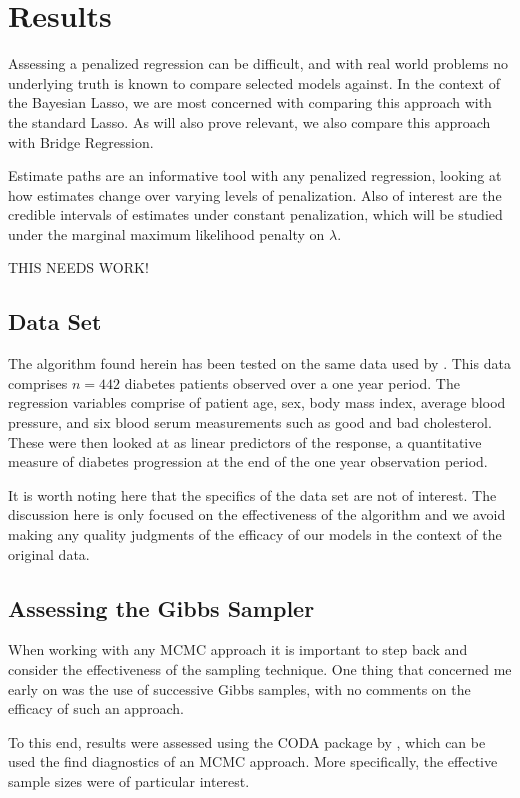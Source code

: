 \documentclass{uwstat572}
\begin{document}
\section{Results}
Assessing a penalized regression can be difficult, and with real world problems no underlying truth is known to compare selected models against. In the context of the Bayesian Lasso, we are most concerned with comparing this approach with the standard Lasso. As will also prove relevant, we also compare this approach with Bridge Regression. 

Estimate paths are an informative tool with any penalized regression, looking at how estimates change over varying levels of penalization. Also of interest are the credible intervals of estimates under constant penalization, which will be studied under the marginal maximum likelihood penalty on $\lambda$.

THIS NEEDS WORK!

\subsection{Data Set}
The algorithm found herein has been tested on the same data used by \cite{efron2004least}. This data comprises $n=442$ diabetes patients observed over a one year period. The regression variables comprise of patient age, sex, body mass index, average blood pressure, and six blood serum measurements such as good and bad cholesterol. These were then looked at as linear predictors of the response, a quantitative measure of diabetes progression at the end of the one year observation period.

It is worth noting here that the specifics of the data set are not of interest. The discussion here is only focused on the effectiveness of the algorithm and we avoid making any quality judgments of the efficacy of our models in the context of the original data.

\subsection{Assessing the Gibbs Sampler}
When working with any MCMC approach it is important to step back and consider the effectiveness of the sampling technique. One thing that concerned me early on was the use of successive Gibbs samples, with no comments on the efficacy of such an approach.

To this end, results were assessed using the CODA package by \cite{codapackage}, which can be used the find diagnostics of an MCMC approach. More specifically, the effective sample sizes were of particular interest.
\end{document}
